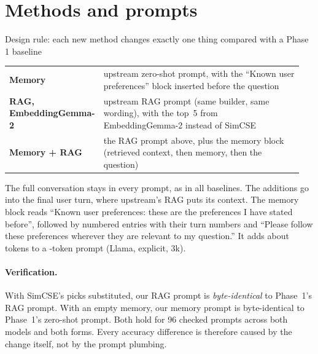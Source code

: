 \documentclass[11pt,a4paper]{article}
\begin{document}
\section{Methods and prompts}\label{sec:methods}
\begin{decision}{Design rule: each new method changes exactly one thing compared with a Phase 1 baseline}
\begin{tabular}{@{}p{0.27\linewidth}p{0.68\linewidth}@{}}
\textbf{Memory} & upstream zero-shot prompt, with the ``Known user preferences'' block inserted before the question \\
\textbf{RAG, EmbeddingGemma-2} & upstream RAG prompt (same builder, same wording), with the top~5 from EmbeddingGemma-2 instead of SimCSE \\
\textbf{Memory + RAG} & the RAG prompt above, plus the memory block (retrieved context, then memory, then the question) \\
\end{tabular}
\end{decision}

The full conversation stays in every prompt, as in all baselines. The additions go into the final user turn, where upstream's RAG puts its
context. The memory block reads ``Known user preferences: these are the preferences I have stated before'', followed by numbered entries with their turn
numbers and ``Please follow these preferences wherever they are relevant to my question.'' It adds about \qTokAdd{} tokens to a \qTokZs-token
prompt (Llama, explicit, 3k).

\paragraph{Verification.} With SimCSE's picks substituted, our RAG prompt is \emph{byte-identical} to Phase~1's RAG prompt. With an empty memory,
our memory prompt is byte-identical to Phase~1's zero-shot prompt. Both hold for 96 checked prompts across both models and both forms. Every
accuracy difference is therefore caused by the change itself, not by the prompt plumbing.
\end{document}
